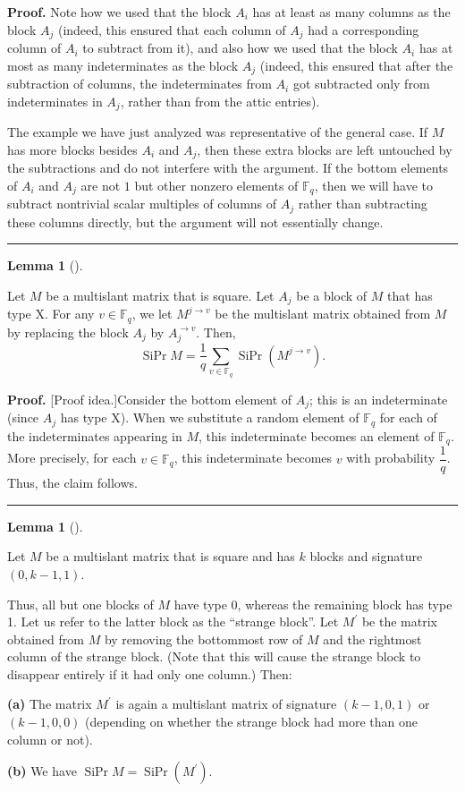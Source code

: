 \documentclass[numbers=enddot,12pt,final,onecolumn,notitlepage]{scrartcl}%
\theoremstyle{definition}
\newtheorem{lem}[theo]{Lemma}
\newenvironment{lemma}[1][]
{\begin{lem}[#1]\begin{leftbar}}
{\end{leftbar}\end{lem}}
\newenvironment{proof}[1][Proof]{\noindent\textbf{#1.} }{\ \rule{0.5em}{0.5em}}
\let\sumnonlimits\sum
\renewcommand{\sum}{\sumnonlimits\limits}
\newcommand{\Fq}{\mathbb{F}_q}
\theoremstyle{plainsl}
\begin{document}
\begin{proof}
Note how we used that the block $A_{i}$ has at least as many columns as the
block $A_{j}$ (indeed, this ensured that each column of $A_{j}$ had a
corresponding column of $A_{i}$ to subtract from it), and also how we used
that the block $A_{i}$ has at most as many indeterminates as the block $A_{j}$
(indeed, this ensured that after the subtraction of columns, the
indeterminates from $A_{i}$ got subtracted only from indeterminates in $A_{j}%
$, rather than from the attic entries).

The example we have just analyzed was representative of the general case. If
$M$ has more blocks besides $A_{i}$ and $A_{j}$, then these extra blocks are
left untouched by the subtractions and do not interfere with the argument. If
the bottom elements of $A_{i}$ and $A_{j}$ are not $1$ but other nonzero
elements of $\Fq$, then we will have to subtract nontrivial scalar multiples of
columns of $A_{j}$ rather than subtracting these columns directly, but the
argument will not essentially change.
\end{proof}

\begin{lemma}
\label{lem.multislant.redX}Let $M$ be a multislant matrix that is square. Let
$A_{j}$ be a block of $M$ that has type X. For any $v\in \Fq$, we let
$M^{j\rightarrow v}$ be the multislant matrix obtained from $M$ by replacing
the block $A_{j}$ by $A_{j}^{\rightarrow v}$. Then,
\[
\operatorname*{SiPr}M=\dfrac{1}{q}\sum_{v\in \Fq}\operatorname*{SiPr}\left(
M^{j\rightarrow v}\right)  .
\]

\end{lemma}

\begin{proof}
[Proof idea.]Consider the bottom element of $A_{j}$; this is an indeterminate
(since $A_{j}$ has type X). When we substitute a random element of $\Fq$ for
each of the indeterminates appearing in $M$, this indeterminate becomes an
element of $\Fq$. More precisely, for each $v\in \Fq$, this indeterminate becomes
$v$ with probability $\dfrac{1}{q}$. Thus, the claim follows.
\end{proof}

\begin{lemma}
\label{lem.multislant.red01}Let $M$ be a multislant matrix that is square and
has $k$ blocks and signature $\left(  0,k-1,1\right)  $.

Thus, all but one blocks of $M$ have type 0, whereas the remaining block has
type 1. Let us refer to the latter block as the ``strange
block''. Let $M^{\prime}$ be the matrix obtained from $M$ by
removing the bottommost row of $M$ and the rightmost column of the strange
block. (Note that this will cause the strange block to disappear entirely if
it had only one column.) Then:

\textbf{(a)} The matrix $M^{\prime}$ is again a multislant matrix of signature
$\left(  k-1,0,1\right)  $ or $\left(  k-1,0,0\right)  $ (depending on whether
the strange block had more than one column or not).

\textbf{(b)} We have $\operatorname*{SiPr}M=\operatorname*{SiPr}\left(
M^{\prime}\right)  $.
\end{lemma}
\end{document}
